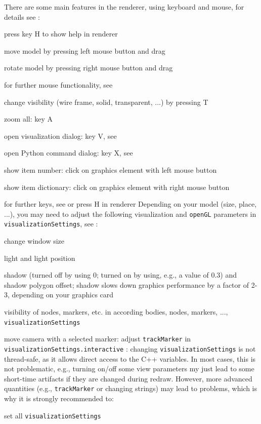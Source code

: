 \noindent There are some main features in the renderer, using keyboard and mouse, for details see :
\bi
  \item press key H to show help in renderer
  \item move model by pressing left mouse button and drag
  \item rotate model by pressing right mouse button and drag
  \item for further mouse functionality, see 
  \item change visibility (wire frame, solid, transparent, ...) by pressing T
  \item zoom all: key A
  \item open visualization dialog: key V, see 
  \item open Python command dialog: key X, see 
  \item show item number: click on graphics element with left mouse button
  \item show item dictionary: click on graphics element with right mouse button  
  \item for further keys, see  or press H in renderer
\ei
%
Depending on your model (size, place, ...), you may need to adjust the following visualization and \texttt{openGL} parameters in \texttt{visualizationSettings}, see :
\bi
  \item change window size
  \item light and light position 
  \item shadow (turned off by using 0; turned on by using, e.g., a value of 0.3) and shadow polygon offset; shadow slows down graphics performance by a factor of 2-3, depending on your graphics card
  \item visibility of nodes, markers, etc. in according bodies, nodes, markers, ..., \texttt{visualizationSettings}
  \item move camera with a selected marker: adjust \texttt{trackMarker} in \texttt{visualizationSettings.interactive}
\ei
{}: changing \texttt{visualizationSettings} is not thread-safe, as it allows direct access to the C++ variables. 
In most cases, this is not problematic, e.g., turning on/off some view parameters my just lead to some short-time artifacts if
they are changed during redraw. However, more advanced quantities (e.g., \texttt{trackMarker} or changing strings) may lead to problems, 
which is why it is strongly recommended to:
\bi
  \item set all \texttt{visualizationSettings} 
\ei

